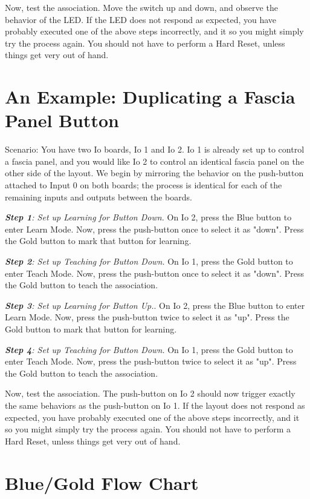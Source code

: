 \documentclass[12pt]{book}
\begin{document}
Now, test the association. Move the switch up and down, and observe the behavior of the LED. If the LED does not respond as expected, you have probably executed one of the above steps incorrectly, and it so you might simply try the process again. You should not have to perform a Hard Reset, unless things get very out of hand.

\section{An Example: Duplicating a Fascia Panel Button}

Scenario: You have two Io boards, Io 1 and Io 2. Io 1 is already set up to control a fascia panel, and you would like Io 2 to control an identical fascia panel on the other side of the layout. We begin by mirroring the behavior on the push-button attached to Input 0 on both boards; the process is identical for each of the remaining inputs and outputs between the boards.

\textit{\textbf{Step 1}: Set up Learning for Button Down.} On Io 2, press the Blue button to enter Learn Mode. Now, press the push-button once to select it as "down". Press the Gold button to mark that button for learning.

\textit{\textbf{Step 2}: Set up Teaching for Button Down.} On Io 1, press the Gold button to enter Teach Mode. Now, press the push-button once to select it as "down". Press the Gold button to teach the association.

\textit{\textbf{Step 3}: Set up Learning for Button Up.}. On Io 2, press the Blue button to enter Learn Mode. Now, press the push-button twice to select it as "up". Press the Gold button to mark that button for learning.

\textit{\textbf{Step 4}:  Set up Teaching for Button Down.} On Io 1, press the Gold button to enter Teach Mode. Now, press the push-button twice to select it as "up". Press the Gold button to teach the association.

Now, test the association. The push-button on Io 2 should now trigger exactly the same behaviors as the push-button on Io 1. If the layout does not respond as expected, you have probably executed one of the above steps incorrectly, and it so you might simply try the process again. You should not have to perform a Hard Reset, unless things get very out of hand.

\section{Blue/Gold Flow Chart}
\end{document}
